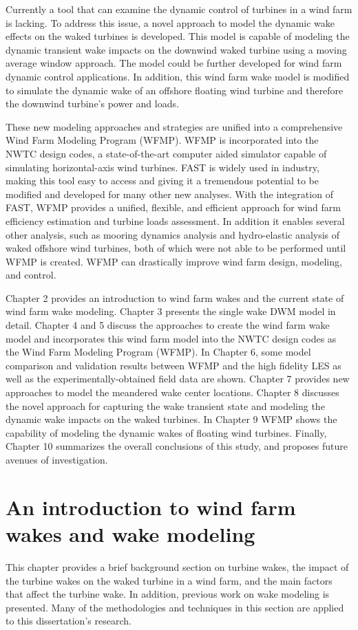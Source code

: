 \documentclass{umthesis}
\begin{document}
Currently a tool that can examine the dynamic control of turbines in a wind farm is lacking. To address this issue, a novel approach to model the dynamic wake effects on the waked turbines is developed. This model is capable of modeling the dynamic transient wake impacts on the downwind waked turbine using a moving average window approach. The model could be further developed for wind farm dynamic control applications. In addition, this wind farm wake model is modified to simulate the dynamic wake of an offshore floating wind turbine and therefore the downwind turbine's power and loads.

These new modeling approaches and strategies are unified into a comprehensive Wind Farm Modeling Program (WFMP). WFMP is incorporated into the NWTC design codes, a state-of-the-art computer aided simulator capable of simulating horizontal-axis wind turbines. FAST is widely used in industry, making this tool easy to access and giving it a tremendous potential to be modified and developed for many other new analyses. With the integration of FAST,  WFMP provides a unified, flexible, and efficient approach for wind farm efficiency estimation and turbine loads assessment. In addition it enables several other analysis, such as mooring dynamics analysis and hydro-elastic analysis of waked offshore wind turbines, both of which were not able to be performed until WFMP is created. WFMP can drastically improve wind farm design, modeling, and control.

Chapter 2 provides an introduction to wind farm wakes and the current state of wind farm wake modeling. Chapter 3 presents the single wake DWM model in detail. Chapter 4 and 5 discuss the approaches to create the wind farm wake model and incorporates this wind farm model into the NWTC design codes as the Wind Farm Modeling Program (WFMP). In Chapter 6, some model comparison and validation results between WFMP and the high fidelity LES as well as the experimentally-obtained field data are shown. Chapter 7 provides new approaches to model the meandered wake center locations. Chapter 8 discusses the novel approach for capturing the wake transient state and modeling the dynamic wake impacts on the waked turbines. In Chapter 9 WFMP shows the capability of modeling the dynamic wakes of floating wind turbines.  Finally, Chapter 10 summarizes the overall conclusions of this study, and proposes future avenues of investigation.


\chapter{An introduction to wind farm wakes and wake modeling}
This chapter provides a brief background section on turbine wakes, the impact of the turbine wakes on the waked turbine in a wind farm, and the main factors that affect the turbine wake. In addition, previous work on wake modeling is presented. Many of the methodologies and techniques in this section are applied to this dissertation's research.
\end{document}
